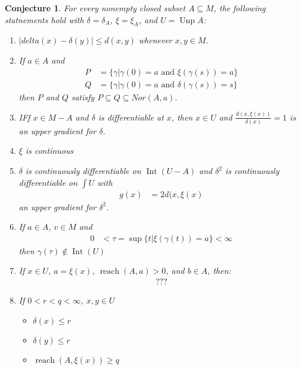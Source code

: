\documentclass{article}
\theoremstyle{plain}
\newtheorem{conj}[thm]{Conjecture}
\theoremstyle{definition}
\renewcommand{\(}{\left(}
\renewcommand{\)}{\right)}
\DeclareMathOperator{\Int}{Int}
\DeclareMathOperator*{\reach}{reach}
\DeclareMathOperator*{\Unp}{Unp}
\begin{document}
\begin{conj}
  For every nonempty closed subset $A \subseteq M$, the following statnements hold with $\delta = \delta_A$, $\xi = \xi_A$, and $U = \Unp A$:
  \begin{enumerate}
  \item $\vert delta(x) - \delta(y)\vert \leq d(x,y)$ whenever $x,y \in M$.
  \item If $a \in A$ and
    \begin{align*}
      P &= \{\gamma \vert \gamma(0) = a \text{ and } \xi(\gamma(s)) = a\}
   \\ Q &= \{\gamma \vert \gamma(0) = a \text{ and } \delta(\gamma(s)) = s\}
    \end{align*}
    then $P$ and $Q$ satisfy $P \subseteq Q \subseteq Nor(A,a)$.
  \item IFf $x \in M - A$ and $\delta$ is differentiable at $x$, then $x \in U$ and
    $\frac{d(x,\xi(x))}{\delta(x)} = 1$ is an upper gradient for $\delta$. %
  \item $\xi$ is continuous
  \item $\delta$ is continuously differentiable on $\Int(U - A)$ and $\delta^2$ is continuously differentiable on $\int U$ with
    \begin{align*}
      g(x) &= 2 d(x,\xi(x)
    \end{align*}
    an upper gradient for $\delta^2$.
  \item If $a \in A$, $v \in M$ and
    \begin{align*}
      0 &< \tau = \sup\{t \vert \xi(\gamma(t)) = a\} < \infty
    \end{align*}
    then $\gamma(\tau) \notin \Int(U)$
  \item If $x \in U$, $a = \xi(x)$, $\reach(A,a) > 0$, and $b \in A$, then:
    \begin{align*}
      ??? %
    \end{align*}
  \item If $0 < r < q < \infty$, $x,y \in U$
    \begin{itemize}
    \item $\delta(x) \leq r$
    \item $\delta(y) \leq r$
    \item $\reach(A,\xi(x)) \geq q$

\end{itemize}
\end{enumerate}
\end{conj}
\end{document}
